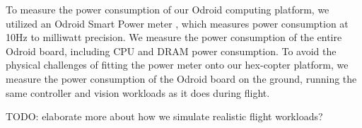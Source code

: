 To measure the power consumption of our Odroid computing platform, we utilized
an Odroid Smart Power meter \cite{OdroidSmartPower}, which measures power
consumption at 10Hz to milliwatt precision. We measure the power consumption of
the entire Odroid board, including CPU and DRAM power consumption. To avoid the
physical challenges of fitting the power meter onto our hex-copter platform, we
measure the power consumption of the Odroid board on the ground, running the
same controller and vision workloads as it does during flight.

TODO: elaborate more about how we simulate realistic flight workloads?
